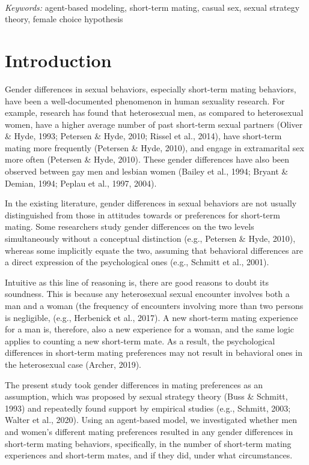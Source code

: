 \documentclass[
  11pt,
]{article}
\begin{document}
~

\emph{Keywords:} agent-based modeling, short-term mating, casual sex,
sexual strategy theory, female choice hypothesis

\newpage

\hypertarget{introduction}{%
\section{Introduction}\label{introduction}}

Gender differences in sexual behaviors, especially short-term mating
behaviors, have been a well-documented phenomenon in human sexuality
research. For example, research has found that heterosexual men, as
compared to heterosexual women, have a higher average number of past
short-term sexual partners (Oliver \& Hyde, 1993; Petersen \& Hyde,
2010; Rissel et al., 2014), have short-term mating more frequently
(Petersen \& Hyde, 2010), and engage in extramarital sex more often
(Petersen \& Hyde, 2010). These gender differences have also been
observed between gay men and lesbian women (Bailey et al., 1994; Bryant
\& Demian, 1994; Peplau et al., 1997, 2004).

In the existing literature, gender differences in sexual behaviors are
not usually distinguished from those in attitudes towards or preferences
for short-term mating. Some researchers study gender differences on the
two levels simultaneously without a conceptual distinction (e.g.,
Petersen \& Hyde, 2010), whereas some implicitly equate the two,
assuming that behavioral differences are a direct expression of the
psychological ones (e.g., Schmitt et al., 2001).

Intuitive as this line of reasoning is, there are good reasons to doubt
its soundness. This is because any heterosexual sexual encounter
involves both a man and a woman (the frequency of encounters involving
more than two persons is negligible, (e.g., Herbenick et al., 2017). A
new short-term mating experience for a man is, therefore, also a new
experience for a woman, and the same logic applies to counting a new
short-term mate. As a result, the psychological differences in
short-term mating preferences may not result in behavioral ones in the
heterosexual case (Archer, 2019).

The present study took gender differences in mating preferences as an
assumption, which was proposed by sexual strategy theory (Buss \&
Schmitt, 1993) and repeatedly found support by empirical studies (e.g.,
Schmitt, 2003; Walter et al., 2020). Using an agent-based model, we
investigated whether men and women's different mating preferences
resulted in any gender differences in short-term mating behaviors,
specifically, in the number of short-term mating experiences and
short-term mates, and if they did, under what circumstances.
\end{document}
